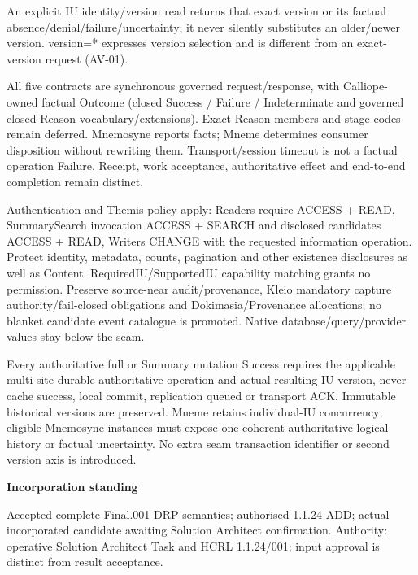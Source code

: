 An explicit IU identity/version read returns that exact version or its factual absence/denial/failure/uncertainty; it never silently substitutes an older/newer version. version=* expresses version selection and is different from an exact-version request (AV-01).



All five contracts are synchronous governed request/response, with Calliope-owned factual Outcome (closed Success / Failure / Indeterminate and governed closed Reason vocabulary/extensions). Exact Reason members and stage codes remain deferred. Mnemosyne reports facts; Mneme determines consumer disposition without rewriting them. Transport/session timeout is not a factual operation Failure. Receipt, work acceptance, authoritative effect and end-to-end completion remain distinct.



Authentication and Themis policy apply: Readers require ACCESS + READ, SummarySearch invocation ACCESS + SEARCH and disclosed candidates ACCESS + READ, Writers CHANGE with the requested information operation. Protect identity, metadata, counts, pagination and other existence disclosures as well as Content. RequiredIU/SupportedIU capability matching grants no permission. Preserve source-near audit/provenance, Kleio mandatory capture authority/fail-closed obligations and Dokimasia/Provenance allocations; no blanket candidate event catalogue is promoted. Native database/query/provider values stay below the seam.



Every authoritative full or Summary mutation Success requires the applicable multi-site durable authoritative operation and actual resulting IU version, never cache success, local commit, replication queued or transport ACK. Immutable historical versions are preserved. Mneme retains individual-IU concurrency; eligible Mnemosyne instances must expose one coherent authoritative logical history or factual uncertainty. No extra seam transaction identifier or second version axis is introduced.



\par\medskip\textbf{Incorporation standing}\par


Accepted complete Final.001 DRP semantics; authorised 1.1.24 ADD; actual incorporated candidate awaiting Solution Architect confirmation. Authority: operative Solution Architect Task and HCRL 1.1.24/001; input approval is distinct from result acceptance.


